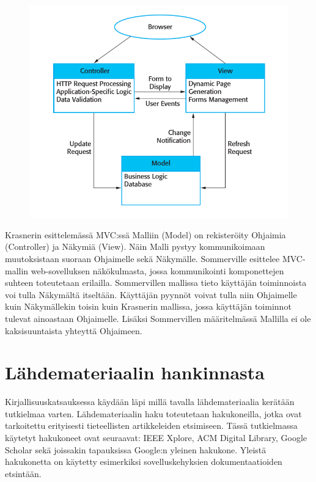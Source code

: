 \documentclass[utf8]{gradu3}
\begin{document}
\begin{figure}[h]
\centering
\includegraphics[scale=0.45]{mvc.png}
\caption{\parencite[s.162]{Sommerville}}
\end{figure}



Krasnerin esittelemässä MVC:ssä Malliin (Model) on rekisteröity Ohjaimia (Controller) ja Näkymiä (View). Näin Malli pystyy kommunikoimaan muutoksistaan suoraan Ohjaimelle sekä Näkymälle.
Sommerville esittelee MVC-mallin web-sovelluksen näkökulmasta, jossa kommunikointi komponettejen suhteen toteutetaan erilailla. Sommervillen mallissa tieto käyttäjän toiminnoista voi tulla 
Näkymältä itseltään. Käyttäjän pyynnöt voivat tulla niin Ohjaimelle kuin Näkymällekin toisin kuin Krasnerin mallissa, jossa käyttäjän toiminnot tulevat ainoastaan Ohjaimelle.
Lisäksi Sommervillen määritelmässä Mallilla ei ole kaksisuuntaista yhteyttä Ohjaimeen.

\chapter{Lähdemateriaalin hankinnasta}

Kirjallisuuskatsauksessa käydään läpi millä tavalla lähdemateriaalia kerätään tutkielmaa varten. Lähdemateriaalin 
haku toteutetaan hakukoneilla, jotka ovat tarkoitettu erityisesti 
tieteellisten artikkeleiden etsimiseen. Tässä tutkielmassa käytetyt 
hakukoneet ovat seuraavat: IEEE Xplore, ACM Digital Library, 
Google Scholar sekä joissakin tapauksissa Google:n yleinen
hakukone. Yleistä hakukonetta on käytetty esimerkiksi
sovelluskehyksien dokumentaatioiden etsintään.
\end{document}
